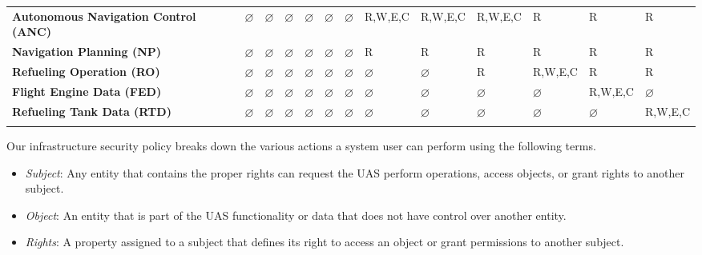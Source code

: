 \documentclass[10pt,journal,compsoc]{IEEEtran}
\begin{document}
\begin{table*}[]
{\begin{tabular}{lllllllllllll}
    \multicolumn{1}{l|}{\textbf{Autonomous Navigation Control (ANC)}} & $\varnothing$ & $\varnothing$ & $\varnothing$ & $\varnothing$ & $\varnothing$ & $\varnothing$ & R,W,E,C       & R,W,E,C       & R,W,E,C       & R             & R             & R             \\
    \multicolumn{1}{l|}{\textbf{Navigation Planning (NP)}}            & $\varnothing$ & $\varnothing$ & $\varnothing$ & $\varnothing$ & $\varnothing$ & $\varnothing$ & R             & R             & R             & R             & R             & R             \\
    \multicolumn{1}{l|}{\textbf{Refueling Operation (RO)}}            & $\varnothing$ & $\varnothing$ & $\varnothing$ & $\varnothing$ & $\varnothing$ & $\varnothing$ & $\varnothing$ & $\varnothing$ & R             & R,W,E,C       & R             & R             \\
    \multicolumn{1}{l|}{\textbf{Flight Engine Data (FED)}}            & $\varnothing$ & $\varnothing$ & $\varnothing$ & $\varnothing$ & $\varnothing$ & $\varnothing$ & $\varnothing$ & $\varnothing$ & $\varnothing$ & $\varnothing$ & R,W,E,C       & $\varnothing$ \\
    \multicolumn{1}{l|}{\textbf{Refueling Tank Data (RTD)}}           & $\varnothing$ & $\varnothing$ & $\varnothing$ & $\varnothing$ & $\varnothing$ & $\varnothing$ & $\varnothing$ & $\varnothing$ & $\varnothing$ & $\varnothing$ & $\varnothing$ & R,W,E,C       \\
                                                                      &               &               &               &               &               &               &               &               &               &               &               &              
  \end{tabular}}
  \end{table*}

  Our infrastructure security policy breaks down the various actions a system user can perform using the following terms. 

  \begin{itemize}
    \item \textit{Subject}: Any entity that contains the proper rights can request the UAS perform operations, access objects, or grant rights to another subject.
    \item \textit{Object}: An entity that is part of the UAS functionality or data that does not have control over another entity. 
    \item \textit{Rights}: A property assigned to a subject that defines its right to access an object or grant permissions to another subject.
  \end{itemize}
  
\end{document}
